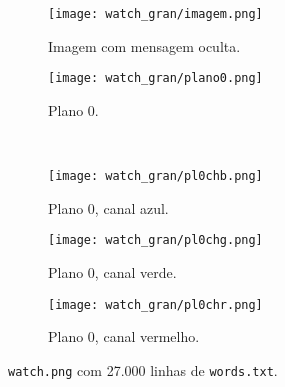 \begin{figure}[H]
    \centering
    \begin{subfigure}{0.4\textwidth}
        \centering
        \texttt{[image: watch\_gran/imagem.png]}
        \caption{Imagem com mensagem oculta.}
        \label{fig:grande:imagem}
    \end{subfigure}%
    \begin{subfigure}{0.4\textwidth}
        \centering
        \texttt{[image: watch\_gran/plano0.png]}
        \caption{Plano 0.}
        \label{fig:grande:plano}
    \end{subfigure}\\[8pt]
    \begin{subfigure}{0.28\textwidth}
        \centering
        \texttt{[image: watch\_gran/pl0chb.png]}
        \caption{Plano 0, canal azul.}
        \label{fig:grande:blue}
    \end{subfigure}%
    \begin{subfigure}{0.28\textwidth}
        \centering
        \texttt{[image: watch\_gran/pl0chg.png]}
        \caption{Plano 0, canal verde.}
        \label{fig:grande:green}
    \end{subfigure}%
    \begin{subfigure}{0.28\textwidth}
        \centering
        \texttt{[image: watch\_gran/pl0chr.png]}
        \caption{Plano 0, canal vermelho.}
        \label{fig:grande:red}
    \end{subfigure}%

    \caption{\texttt{watch.png} com 27.000 linhas de \texttt{words.txt}.}
    \label{fig:grande}
\end{figure}